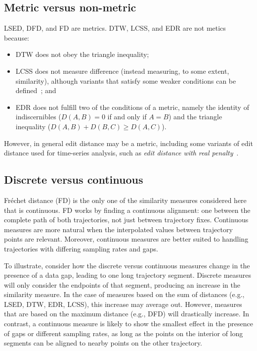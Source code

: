 \documentclass{interact}
\begin{document}


\subsection{Metric versus non-metric}

LSED, DFD, and FD are metrics.  DTW, LCSS, and EDR are not metics because:
\begin{itemize}
\item DTW does not obey the triangle inequality;
\item LCSS does not measure difference (instead measuring, to some extent, similarity), although variants that satisfy some weaker conditions can be defined~\citep{VlachosGK02}; and
\item EDR does not fulfill two of the conditions of a metric, namely the identity of indiscernibles ($D(A, B) = 0$  if and only if   $A = B$)  and the triangle inequality ($D(A, B) + D(B, C) \geq D(A, C)$).
\end{itemize}
However, in general edit distance may be a metric, including some variants of edit distance used for time-series analysis, such as \emph{edit distance with real penalty}~\citep{NgC04}.

\subsection{Discrete versus continuous}

Fr\'echet distance (FD) is the only one of the similarity measures considered here that is continuous. FD works by finding a continuous alignment: one between the complete path of both trajectories, not just between trajectory fixes. Continuous measures are more natural when the interpolated values between trajectory points are relevant. Moreover, continuous measures are better suited to handling trajectories with differing sampling rates and gaps.

To illustrate, consider how the discrete versus continuous measures change in the presence of a data gap, leading to one long trajectory segment. Discrete measures will only consider the endpoints of that segment, producing an increase in the similarity measure. In the case of measures based on the sum of distances (e.g., LSED, DTW, EDR, LCSS), this increase may average out. However, measures that are based on the maximum distance (e.g., DFD) will drastically increase. In contrast, a continuous measure is likely to show the smallest effect in the presence of gaps or different sampling rates, as long as the points on the interior of long segments can be aligned to nearby points on the other trajectory.
\end{document}
